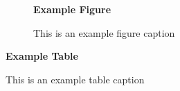 \documentclass{omgrpt}
\begin{document}
\begin{figure}
  \centering
  \centerline{\Large\textbf{Example Figure}}
  \caption{This is an example figure caption}
\end{figure}

\begin{table}
  \centering
  \centerline{\Large\textbf{Example Table}}  
  \caption{This is an example table caption}
  \label{tab:asdf}
\end{table}

\label{ocl-2:examples}
\lipsum[2-3]

\label{ocl-3:examples}
\lipsum[2-3]

\label{ocl-4:examples}
\lipsum[2-3]

\label{ocl-0:examples}
\lipsum[2-3]
\end{document}
